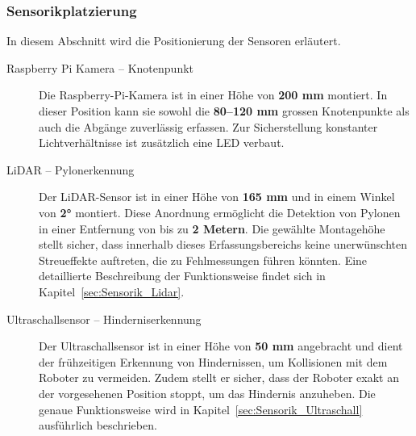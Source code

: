 \documentclass[main.tex]{subfiles} %
\begin{document}
\subsubsection{Sensorikplatzierung}

In diesem Abschnitt wird die Positionierung der Sensoren erläutert.

\begin{description}
    \item[Raspberry Pi Kamera – Knotenpunkt] Die Raspberry-Pi-Kamera ist in einer Höhe von \textbf{200 mm} montiert. In dieser Position kann 
        sie sowohl die \textbf{80–120 mm} grossen Knotenpunkte als auch die Abgänge zuverlässig erfassen. 
        Zur Sicherstellung konstanter Lichtverhältnisse ist zusätzlich eine LED verbaut.
    
    \item[LiDAR – Pylonerkennung] Der LiDAR-Sensor ist in einer Höhe von \textbf{165 mm} und in einem Winkel von \textbf{2°} montiert. 
        Diese Anordnung ermöglicht die Detektion von Pylonen in einer Entfernung von bis zu \textbf{2 Metern}. 
        Die gewählte Montagehöhe stellt sicher, dass innerhalb dieses Erfassungsbereichs keine unerwünschten 
        Streueffekte auftreten, die zu Fehlmessungen führen könnten. Eine detaillierte Beschreibung der 
        Funktionsweise findet sich in Kapitel~\ref{sec:Sensorik_Lidar}.
    
    \item[Ultraschallsensor – Hinderniserkennung] Der Ultraschallsensor ist in einer Höhe von \textbf{50 mm} angebracht und dient der frühzeitigen 
        Erkennung von Hindernissen, um Kollisionen mit dem Roboter zu vermeiden. Zudem stellt er sicher, 
        dass der Roboter exakt an der vorgesehenen Position stoppt, um das Hindernis anzuheben. Die genaue 
        Funktionsweise wird in Kapitel~\ref{sec:Sensorik_Ultraschall} ausführlich beschrieben.

\end{description}
\end{document}
